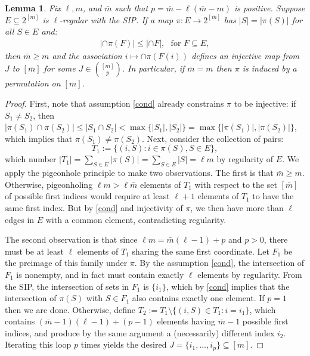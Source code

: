 \documentclass[9pt,twocolumn]{pnas-new}
\newtheorem{lemma}{Lemma}
\begin{document}
\begin{lemma}\label{NonEmptyLemma} 
Fix $\ell, m$, and $\bar m$ such that $p = \bar m - \ell(\bar m - m)$ is positive. Suppose $E \subseteq 2^{[m]}$ is $\ell$-regular with the SIP. If a map $\pi: E \to 2^{[\bar m]}$ has $|S| = |\pi(S)|$ for all $S \in E$ and:
\begin{align}\label{cond}
|\cap \pi(F)| \leq |\cap F |,\ \ \   \text{for } F \subseteq E,
\end{align}
then $\bar m \geq m$ and the association $i \mapsto \cap \pi(F(i))$ defines an injective map from $J$ to $[\bar m]$ for some $J \in {[m] \choose p}$. In particular, if $\bar m = m$ then $\pi$ is induced by a permutation on $[m]$.
\end{lemma}


\begin{proof}
First, note that assumption \eqref{cond} already constrains $\pi$ to be injective:  if $S_1 \neq S_2$, then $|\pi(S_1) \cap \pi(S_2)| \leq |S_1 \cap S_2| < \max\{|S_1|, |S_2|\} = \max\{|\pi(S_1)|, |\pi(S_2)|\}$, which implies that $\pi(S_1) \neq \pi(S_2)$.  Next, consider the collection of pairs: \[T_1 := \{(i, S): i \in \pi(S), S \in E\},\] which number $|T_1| = \sum_{S \in E} |\pi(S)| = \sum_{S \in E} |S| = \ell m$ by regularity of $E$. We apply the pigeonhole principle to make two observations. 
The first is that $\bar m \geq m$. Otherwise, pigeonholing $\ell m > \ell \bar m$ elements of $T_1$ with respect to the set $[\bar m]$ of possible first indices would require at least $\ell + 1$ elements of $T_1$ to have the same first index. But by \eqref{cond} and injectivity of $\pi$, we then have more than $\ell$ edges in $E$ with a common element, contradicting regularity. 

The second observation is that since $\ell m = \bar m (\ell - 1) + p$ and $p > 0$, there must be at least $\ell$ elements of $T_1$ sharing the same first coordinate. Let $F_1$ be the preimage of this family under $\pi$.  By the assumption \eqref{cond}, the intersection of $F_1$ is nonempty, and in fact must contain exactly $\ell$ elements by regularity. 
From the SIP, the intersection of sets in $F_1$ is $\{i_1\}$, which by \eqref{cond} implies that the intersection of $\pi(S)$ with $S \in F_1$ also contains exactly one element.  If $p = 1$ then we are done. Otherwise, define $T_2 := T_1 \setminus \{(i,S) \in T_1: i = i_1\}$, which contains $(\bar m - 1)(\ell -1) + (p-1)$ elements having $\bar m - 1$ possible first indices, and produce by the same argument a (necessarily) different index $i_2$. Iterating this loop $p$ times yields the desired $J = \{i_1, \ldots, i_p\} \subseteq [m]$.
\end{proof}
\end{document}

